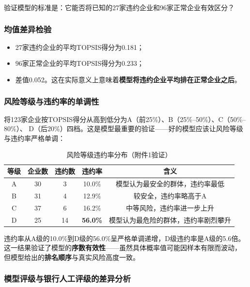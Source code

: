 \documentclass[12pt,a4paper]{ctexart}
\begin{document}
验证模型的标准是：它能否将已知的27家违约企业和96家正常企业有效区分？

\subsubsection{均值差异检验}

\begin{itemize}
    \item 27家违约企业的平均TOPSIS得分为0.181；
    \item 96家正常企业的平均TOPSIS得分为0.233；
    \item 差值0.052。这在实际意义上意味着\textbf{模型将违约企业平均排在正常企业之后}。
\end{itemize}

\subsubsection{风险等级与违约率的单调性}

将123家企业按TOPSIS得分从高到低分为A（前25\%）、B（25\%--50\%）、C（50\%--80\%）、
D（后20\%）四档。这是模型最重要的验证——好的模型应该让风险等级与违约率严格单调：

\begin{table}[H]
\centering
\caption{风险等级违约率分布（附件1验证）}
\label{tab:default_validation}
\begin{tabular}{c|c|c|c|c}
\toprule
\textbf{等级} & \textbf{企业数} & \textbf{违约数} & \textbf{违约率} & \textbf{含义} \\
\midrule
A & 30 & 3 & 10.0\% & 模型认为最安全的群体，违约率最低 \\
B & 31 & 4 & 12.9\% & 较安全，违约率略高于A \\
C & 37 & 6 & 16.2\% & 中等风险，违约率进一步上升 \\
D & 25 & 14 & \textbf{56.0\%} & 模型认为最危险的群体，违约率剧烈攀升 \\
\bottomrule
\end{tabular}
\end{table}

违约率从A级的10.0\%到D级的56.0\%呈严格单调递增，D级违约率是A级的5.6倍。
这一结果验证了模型的\textbf{序数有效性}——虽然具体概率值可能因样本有限而波动，
但模型给出的\textbf{排名顺序}与真实风险高度一致。

\subsubsection{模型评级与银行人工评级的差异分析}
\end{document}

